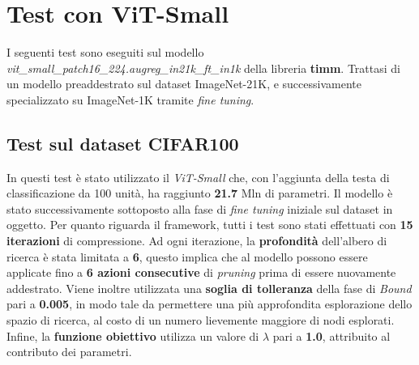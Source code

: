 \section{Test con ViT-Small}
\label{section:test}
I seguenti test sono eseguiti sul modello \textit{vit\_small\_patch16\_224.augreg\_in21k\_ft\_in1k} della libreria \textbf{timm}. Trattasi di un modello preaddestrato sul dataset ImageNet-21K, e successivamente specializzato su ImageNet-1K tramite \textit{fine tuning}.
\subsection{Test sul dataset CIFAR100}
In questi test è stato utilizzato il \textit{ViT-Small} che, con l'aggiunta
della testa di classificazione da 100 unità, ha raggiunto \textbf{21.7} Mln di
parametri. Il modello è stato successivamente sottoposto alla fase di
\textit{fine tuning} iniziale sul dataset in oggetto. Per quanto riguarda il
framework, tutti i test sono stati effettuati con \textbf{15 iterazioni} di
compressione. Ad ogni iterazione, la \textbf{profondità} dell'albero di ricerca
è stata limitata a \textbf{6}, questo implica che al modello possono essere
applicate fino a \textbf{6 azioni consecutive} di \textit{pruning} prima di
essere nuovamente addestrato. Viene inoltre utilizzata una \textbf{soglia di
    tolleranza} della fase di \textit{Bound} pari a \textbf{0.005}, in modo tale da
permettere una più approfondita esplorazione dello spazio di ricerca, al costo
di un numero lievemente maggiore di nodi esplorati. Infine, la \textbf{funzione
    obiettivo} utilizza un valore di \textbf{$\lambda$} pari a \textbf{1.0},
attribuito al contributo dei parametri.
